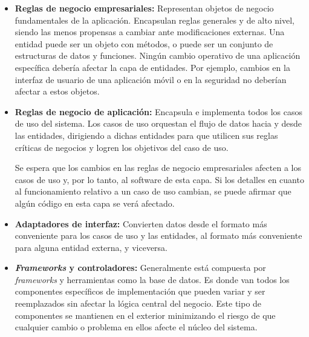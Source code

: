 \begin{itemize}
    \item \textbf{Reglas de negocio empresariales: } Representan objetos de negocio fundamentales de la aplicación. Encapsulan reglas generales y de alto nivel, siendo las menos propensas a cambiar ante modificaciones externas. Una entidad puede ser un objeto con métodos, o puede ser un conjunto de estructuras de datos y funciones. Ningún cambio operativo de una aplicación específica debería afectar la capa de entidades. Por ejemplo, cambios en la interfaz de usuario de una aplicación móvil o en la seguridad no deberían afectar a estos objetos.
    \item \textbf{Reglas de negocio de aplicación: }Encapsula e implementa todos los casos de uso del sistema. Los casos de uso orquestan el flujo de datos hacia y desde las entidades, dirigiendo a dichas entidades para que utilicen sus reglas críticas de negocios y logren los objetivos del caso de uso.

    Se espera que los cambios en las reglas de negocio empresariales afecten a los casos de uso y, por lo tanto, al software de esta capa. Si los detalles en cuanto al funcionamiento relativo a un caso de uso cambian, se puede afirmar que algún código en esta capa se verá afectado.
    
    \item \textbf{Adaptadores de interfaz: }Convierten datos desde el formato más conveniente para los casos de uso y las entidades, al formato más conveniente para alguna entidad externa, y viceversa.

    \item \textbf{\textit{Frameworks} y controladores: }Generalmente está compuesta por \textit{frameworks} y herramientas como la base de datos. Es donde van todos los componentes específicos de implementación que pueden variar y ser reemplazados sin afectar la lógica central del negocio. Este tipo de componentes se mantienen en el exterior minimizando el riesgo de que cualquier cambio o problema en ellos afecte el núcleo del sistema.
\end{itemize}